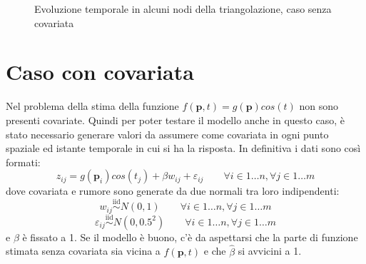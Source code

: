 \documentclass[a4paper,11pt,twoside,openright]{book}							%
\begin{document}
\begin{figure}[t]
	\centering
	\caption{Evoluzione temporale in alcuni nodi della triangolazione, caso senza covariata}
	\label{fig:DomC_ris2}
\end{figure}
\newpage
\section{Caso con covariata}

Nel problema della stima della funzione $f(\bm p,t)=g(\bm p)cos(t)$ non sono presenti covariate. Quindi per poter testare il modello anche in questo caso, è stato necessario generare valori da assumere come covariata in ogni punto spaziale ed istante temporale in cui si ha la risposta.
In definitiva i dati sono così formati:
$$
z_{ij}=g(\bm p_{i})cos(t_j) + \beta w_{ij} + \varepsilon_{ij} \qquad \forall i \in 1\ldots n, \forall j \in 1\ldots m
$$
dove covariata e rumore sono generate da due normali tra loro indipendenti:
$$
w_{ij}\stackrel{\mathrm{iid}}{\sim}N(0,1) \qquad \forall i \in 1\ldots n, \forall j \in 1\ldots m
$$
$$
\varepsilon_{ij}\stackrel{\mathrm{iid}}{\sim}N(0,0.5^2) \qquad \forall i \in 1\ldots n, \forall j \in 1\ldots m
$$
e $\beta$ è fissato a 1. Se il modello è buono, c'è da aspettarsi che la parte di funzione stimata senza covariata sia vicina a $f(\bm p,t)$ e che $\hat{\beta}$ si avvicini a 1.
 
\end{document}
